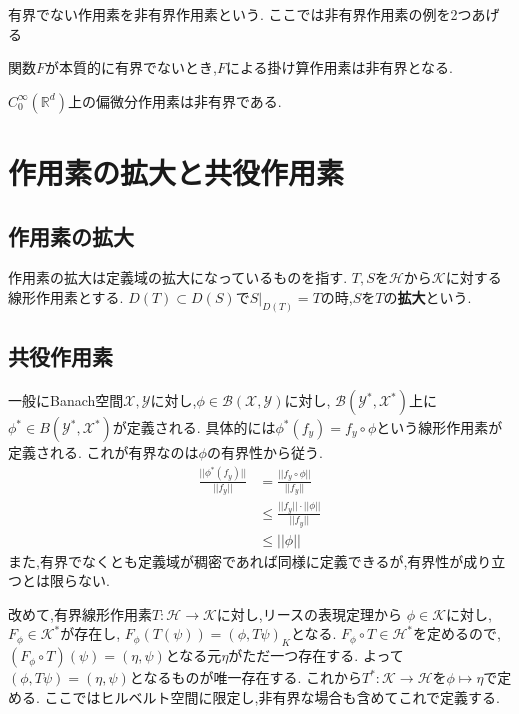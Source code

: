 \documentclass[uplatex]{jsbook}
\begin{document}
有界でない作用素を非有界作用素という.
ここでは非有界作用素の例を2つあげる
\begin{epl}
関数$F$が本質的に有界でないとき,$F$による掛け算作用素は非有界となる.
\end{epl}

\begin{epl}
$C_0 ^{\infty}(\mathbb{R}^{d})$上の偏微分作用素は非有界である.
\end{epl}

\section{作用素の拡大と共役作用素}
\subsection{作用素の拡大}
作用素の拡大は定義域の拡大になっているものを指す.
$T, S$を$\mathcal{H}$から$\mathcal{K}$に対する線形作用素とする.
$D(T) \subset D(S)$で$S|_{D(T)}= T$の時,$S$を$T$の\textbf{拡大}という.

\subsection{共役作用素}
一般にBanach空間$\mathcal{X},\mathcal{Y}$に対し,$\phi \in \mathcal{B}(\mathcal{X}, \mathcal{Y})$に対し,
$\mathcal{B}(\mathcal{Y}^{*},\mathcal{X}^{*})$上に$\phi^* \in B(\mathcal{Y}^*, \mathcal{X}^*)$が定義される.
具体的には$\phi ^{*}(f_y) = f_y \circ\phi$という線形作用素が定義される.
これが有界なのは$\phi$の有界性から従う.
\begin{align*}
    \frac{||\phi^*(f_y)||}{||f_y||} &= \frac{ ||f_y \circ \phi ||}{||f_y||}\\
                                &\le \frac{||f_y|| \cdot ||\phi||}{||f_y||}\\
                                &\le  ||\phi||
\end{align*}
また,有界でなくとも定義域が稠密であれば同様に定義できるが,有界性が成り立つとは限らない.

改めて,有界線形作用素$T: \mathcal{H} \to \mathcal{K}$に対し,リースの表現定理から
$\phi \in \mathcal{K}$に対し,$F_{\phi} \in \mathcal{K}^*$が存在し,
$F_{\phi}(T(\psi)) = (\phi,T\psi)_K$となる.
$F_{\phi} \circ T   \in \mathcal{H}^*$を定めるので,
$(F_{\phi} \circ T )(\psi)= (\eta, \psi)$となる元$\eta$がただ一つ存在する.
よって$(\phi, T\psi) = (\eta, \psi)$となるものが唯一存在する.
これから$T^*:\mathcal{K} \to \mathcal{H}$を$\phi \mapsto \eta$で定める.
ここではヒルベルト空間に限定し,非有界な場合も含めてこれで定義する.
\end{document}
